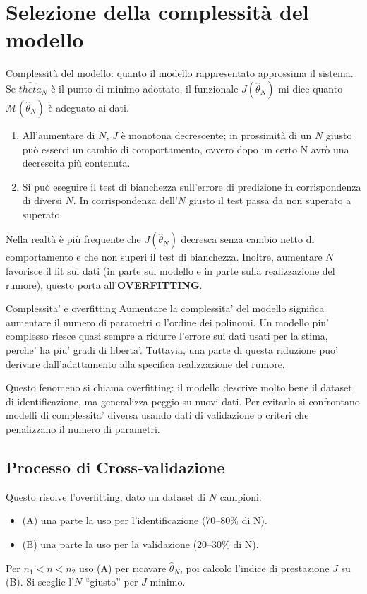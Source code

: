 \documentclass[11pt,a4paper]{article}
\begin{document}
\section{Selezione della complessità del modello}
Complessità del modello: quanto il modello rappresentato approssima il sistema. 
Se $\hat{theta}_N$ è il punto di minimo adottato, il funzionale $J(\hat\theta_N)$ mi dice quanto $\mathcal{M}(\hat\theta_N)$ è adeguato ai dati.
\begin{enumerate}
  \item All'aumentare di $N$, $J$ è monotona decrescente; in prossimità di un $N$ giusto può esserci un cambio di comportamento, ovvero dopo un certo N avrò una decrescita più contenuta.
  \item Si può eseguire il test di bianchezza sull'errore di predizione in corrispondenza di diversi $N$. In corrispondenza dell'$N$ giusto il test passa da non superato a superato.
\end{enumerate}
Nella realtà è più frequente che $J(\hat\theta_N)$ decresca senza cambio netto di comportamento e che non superi il test di bianchezza. Inoltre, aumentare $N$ favorisce il fit sui dati (in parte sul modello e in parte sulla realizzazione del rumore), questo porta all'\textbf{OVERFITTING}. 

\begin{spiegazione}{Complessita' e overfitting}
Aumentare la complessita' del modello significa aumentare il numero di parametri o l'ordine dei polinomi. Un modello piu' complesso riesce quasi sempre a ridurre l'errore sui dati usati per la stima, perche' ha piu' gradi di liberta'. Tuttavia, una parte di questa riduzione puo' derivare dall'adattamento alla specifica realizzazione del rumore.

Questo fenomeno si chiama overfitting: il modello descrive molto bene il dataset di identificazione, ma generalizza peggio su nuovi dati. Per evitarlo si confrontano modelli di complessita' diversa usando dati di validazione o criteri che penalizzano il numero di parametri.
\end{spiegazione}

\subsection{Processo di Cross-validazione}
Questo risolve l'overfitting, dato un dataset di $N$ campioni:
\begin{itemize}
  \item (A) una parte la uso per l'identificazione (70--80\% di N).
  \item (B) una parte la uso per la validazione (20--30\% di N).
\end{itemize}
Per $n_1<n<n_2$ uso (A) per ricavare $\hat\theta_N$, poi calcolo l'indice di prestazione $J$ su (B). Si sceglie l'$N$ ``giusto'' per $J$ minimo.
\end{document}
